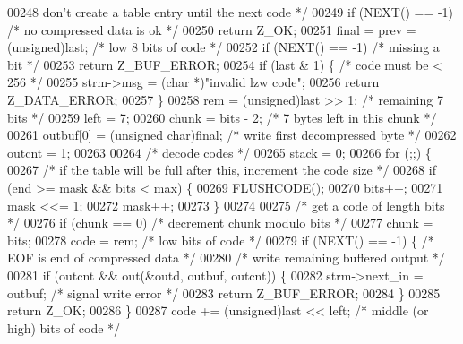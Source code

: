 \begin{DoxyCode}
00248 \textcolor{comment}{       don't create a table entry until the next code */}
00249     \textcolor{keywordflow}{if} (NEXT() == -1)                       \textcolor{comment}{/* no compressed data is ok */}
00250         \textcolor{keywordflow}{return} Z\_OK;
00251     \textcolor{keyword}{final} = prev = (unsigned)last;          \textcolor{comment}{/* low 8 bits of code */}
00252     \textcolor{keywordflow}{if} (NEXT() == -1)                       \textcolor{comment}{/* missing a bit */}
00253         \textcolor{keywordflow}{return} Z\_BUF\_ERROR;
00254     \textcolor{keywordflow}{if} (last & 1) \{                         \textcolor{comment}{/* code must be < 256 */}
00255         strm->msg = (\textcolor{keywordtype}{char} *)\textcolor{stringliteral}{"invalid lzw code"};
00256         \textcolor{keywordflow}{return} Z\_DATA\_ERROR;
00257     \}
00258     rem = (unsigned)last >> 1;              \textcolor{comment}{/* remaining 7 bits */}
00259     left = 7;
00260     chunk = bits - 2;                       \textcolor{comment}{/* 7 bytes left in this chunk */}
00261     outbuf[0] = (\textcolor{keywordtype}{unsigned} char)\textcolor{keyword}{final};       \textcolor{comment}{/* write first decompressed byte */}
00262     outcnt = 1;
00263 
00264     \textcolor{comment}{/* decode codes */}
00265     stack = 0;
00266     \textcolor{keywordflow}{for} (;;) \{
00267         \textcolor{comment}{/* if the table will be full after this, increment the code size */}
00268         \textcolor{keywordflow}{if} (end >= mask && bits < max) \{
00269             FLUSHCODE();
00270             bits++;
00271             mask <<= 1;
00272             mask++;
00273         \}
00274 
00275         \textcolor{comment}{/* get a code of length bits */}
00276         \textcolor{keywordflow}{if} (chunk == 0)                     \textcolor{comment}{/* decrement chunk modulo bits */}
00277             chunk = bits;
00278         code = rem;                         \textcolor{comment}{/* low bits of code */}
00279         \textcolor{keywordflow}{if} (NEXT() == -1) \{                 \textcolor{comment}{/* EOF is end of compressed data */}
00280             \textcolor{comment}{/* write remaining buffered output */}
00281             \textcolor{keywordflow}{if} (outcnt && out(&outd, outbuf, outcnt)) \{
00282                 strm->next\_in = outbuf;     \textcolor{comment}{/* signal write error */}
00283                 \textcolor{keywordflow}{return} Z\_BUF\_ERROR;
00284             \}
00285             \textcolor{keywordflow}{return} Z\_OK;
00286         \}
00287         code += (unsigned)last << left;     \textcolor{comment}{/* middle (or high) bits of code */}

\end{DoxyCode}
